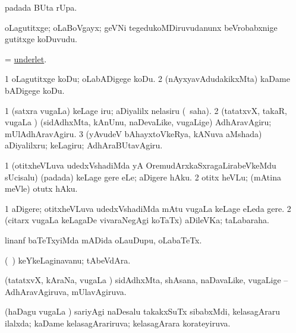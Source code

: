 \bentry
{} 
\gl{\kirx}
\expl{}
\bmng
  padada BUta rUpa. 
\emng
\eentry

\bentry
{} 
\gl{\nA}
\expl{}
\bmng
 oLagutitxge; oLaBoVgayx; geVNi tegedukoMDiruvudanunx beVrobabxnige gutitxge koDuvudu. 
\emng
\eentry

\bentry
{} 
\gl{\sakirx}
\expl{}
\bmng
 = \hyperlink{underlet}{underlet}. 
\emng
\eentry

\bentry
{} 
\gl{\sakirx}
\bmng
\bnum
\num{1} oLagutitxge koDu; oLabADigege koDu. 
\num{2} (nAyxyavAdudakikxMta) kaDame bADigege koDu. 
\enum
\emng
\eentry

\bentry
{} 
\gl{\sakirx}
\bmng
\bnum
\num{1} (satxra \mo vugaLa) keLage iru; aDiyalilx nelasiru (\akirx\ saha). 
\num{2} (tatatxvX, takaR, \mo vugaLa \vi) (sidAdhxMta, kAnUnu, naDevaLike, \mo vugaLige) AdhAravAgiru; mUlAdhAravAgiru. 
\num{3} (yAvudeV bAhayxtoVkeRya, kANuva aMshada) aDiyalilxru; keLagiru; AdhAraBUtavAgiru. 
\enum
\emng
\eentry

\bentry
{} 
\gl{\sakirx}
\expl{}
\bmng
\bnum
\num{1} (otitxheVLuva udedxVshadiMda yA OremudArxkaSxragaLirabeVkeMdu sUcisalu) (padada) keLage gere eLe; aDigere hAku. 
\num{2} otitx heVLu; (mAtina meVle) otutx hAku. 
\enum
\emng
\eentry

\bentry
{} 
\gl{\nA}
\expl{}
\bmng
\bnum
\num{1} aDigere; otitxheVLuva udedxVshadiMda mAtu \mo vugaLa keLage eLeda gere. 
\num{2} (citarx \mo vugaLa keLagaDe vivaraNegAgi koTaTx) aDileVKa; taLabaraha. 
\enum
\emng
\eentry

\bentry
{} 
\gl{\nA}
\expl{}
\bmng
 linanf baTeTxyiMda mADida oLauDupu, oLabaTeTx. 
\emng
\eentry

\bentry
{} 
\gl{\nA}
\expl{}
\bmng
 (\sA\ \hiV) keYkeLaginavanu; tAbeVdAra. 
\emng
\eentry

\bentry
{} 
\gl{\gu}
\expl{}
\bmng
 (tatatxvX, kAraNa, \mo vugaLa \vi) sidAdhxMta, shAsana, naDavaLike, \mo vugaLige -- AdhAravAgiruva, mUlavAgiruva. 
\emng
\eentry

\bentry
{} 
\gl{\gu}
\expl{}
\bmng
 (haDagu \mo vugaLa \vi) sariyAgi naDesalu takakxSuTx sibabxMdi, kelasagAraru ilalxda; kaDame kelasagArariruva; kelasagArara korateyiruva. 
\emng
\eentry

